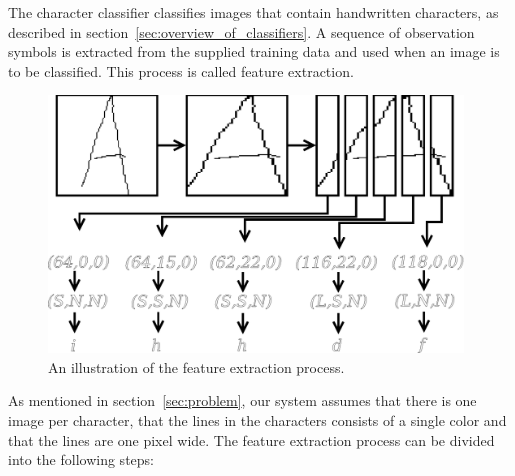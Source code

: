 
The character classifier classifies images that contain handwritten characters, as described in section~\ref{sec:overview_of_classifiers}. 
A sequence of observation symbols is extracted from the supplied training data and used when an image is to be classified. 
This process is called feature extraction. 

    \begin{figure}[htb] 
      \begin{center}
	\leavevmode
	\includegraphics[width=110mm]{image_feature_extraction.eps}%
      \end{center}
      \caption{An illustration of the feature extraction process.}
      \label{fig:image_feature_extraction}
    \end{figure}


As mentioned in section~\ref{sec:problem}, our system assumes that there is one image per character, that the lines in the characters consists of a single color and that the lines are one pixel wide. The feature extraction process can be divided into the following steps:

